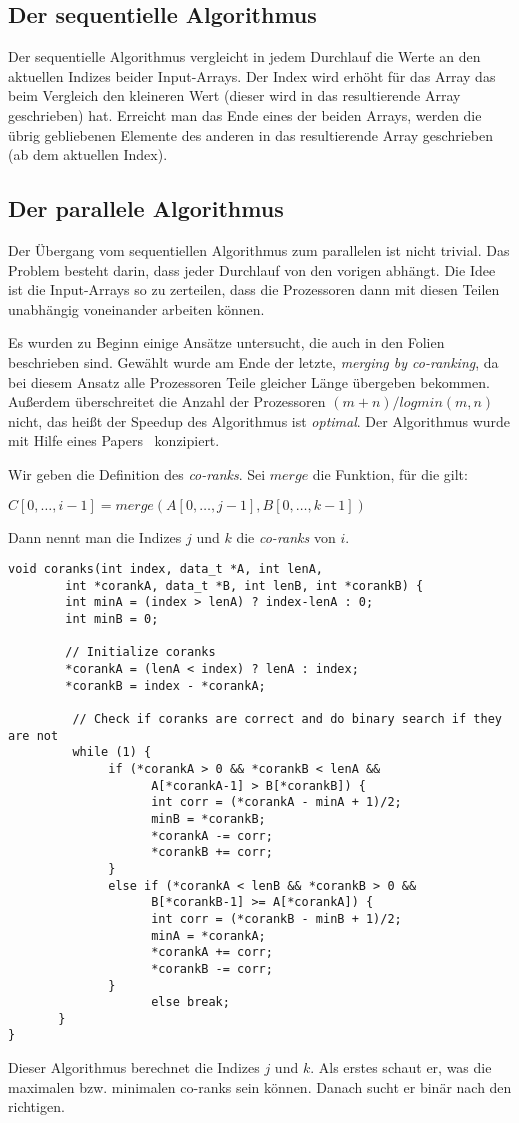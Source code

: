 \subsection{Der sequentielle Algorithmus}
Der sequentielle Algorithmus vergleicht in jedem Durchlauf die Werte an den aktuellen Indizes beider Input-Arrays. Der Index wird erhöht für das Array das beim Vergleich den kleineren Wert (dieser wird in das resultierende Array geschrieben) hat. Erreicht man das Ende eines der beiden Arrays, werden die übrig gebliebenen Elemente des anderen in das resultierende Array geschrieben (ab dem aktuellen Index).

\subsection{Der parallele Algorithmus}
Der Übergang vom sequentiellen Algorithmus zum parallelen ist nicht trivial. Das Problem besteht darin, dass jeder Durchlauf von den vorigen abhängt. Die Idee ist die Input-Arrays so zu zerteilen, dass die Prozessoren dann mit diesen Teilen unabhängig voneinander arbeiten können.

Es wurden zu Beginn einige Ansätze untersucht, die auch in den Folien beschrieben sind. Gewählt wurde am Ende der letzte, \emph{merging by co-ranking}, da bei diesem Ansatz alle Prozessoren Teile gleicher Länge übergeben bekommen. Außerdem überschreitet die Anzahl der Prozessoren $(m+n) / log min(m,n)$ nicht, das heißt der Speedup des Algorithmus ist \emph{optimal}. Der Algorithmus wurde mit Hilfe eines Papers~\cite{corank} konzipiert.

Wir geben die Definition des \emph{co-ranks}. Sei $merge$ die Funktion, für die gilt:
\begin{center}
$C[0,\dots,i-1] = merge(A[0,\dots,j-1], B[0,\dots,k-1])$
\end{center}
Dann nennt man die Indizes $j$ und $k$ die \emph{co-ranks} von $i$.
\begin{verbatim}
void coranks(int index, data_t *A, int lenA, 
        int *corankA, data_t *B, int lenB, int *corankB) {
        int minA = (index > lenA) ? index-lenA : 0;
        int minB = 0;

        // Initialize coranks
        *corankA = (lenA < index) ? lenA : index;
        *corankB = index - *corankA;

         // Check if coranks are correct and do binary search if they are not
         while (1) {
              if (*corankA > 0 && *corankB < lenA && 
                    A[*corankA-1] > B[*corankB]) {
                    int corr = (*corankA - minA + 1)/2;
                    minB = *corankB;
                    *corankA -= corr;
                    *corankB += corr;
              }
              else if (*corankA < lenB && *corankB > 0 && 
                    B[*corankB-1] >= A[*corankA]) {
                    int corr = (*corankB - minB + 1)/2;
                    minA = *corankA;
                    *corankA += corr;
                    *corankB -= corr;
              }
                    else break;
       }
}
\end{verbatim}

Dieser Algorithmus berechnet die Indizes $j$ und $k$. Als erstes schaut er, was die maximalen bzw. minimalen co-ranks sein können. Danach sucht er binär nach den richtigen.